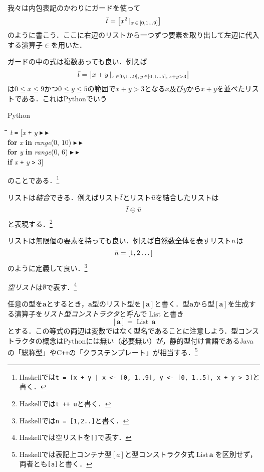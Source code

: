 \documentclass[twocolumn]{jsbook}
\newcommand{\cxx}{\textrm{C}\texttt{++}}
\newcommand{\keyword}[1]{{\emph{#1}}}
\newcommand{\code}[1]{\texttt{#1}}
\newenvironment{pythoncode}{\begin{itembox}[r]{Python}}{\end{itembox}}
\newenvironment{python}{\begin{tabbing}\hspace*{1em}\=\hspace*{1em}\=\hspace*{1em}\=\hspace*{1em}\=\kill}{\end{tabbing}}
\newcommand{\pthnId}[1]{\textit{#1}}
\newcommand{\pthnKeyword}[1]{\textbf{#1}}
\newcommand{\pthnOp}[1]{\texttt{#1}}
\newcommand{\pthnNextLine}{$\blacktriangleright\blacktriangleright$}
\newcommand{\hsklType}[1]{\textbf{#1}}
\newcommand{\hsklTypeConstructor}[1]{\mathop{\mathrm{#1}}}
\DeclareMathOperator{\hsklListConstructor}{\hsklTypeConstructor{List}}
\newcommand{\hsklAppend}{\oplus}
\newcommand{\hsklEmptyList}{\emptyset}
\newcommand{\hsklList}[1]{\Bar{#1}}
\newcommand{\hsklListType}[1]{[#1]}
\newcommand{\hsklTypeConstruct}[2]{#1\,#2}
\DeclareMathOperator{\mathFrom}{\in}
\newcommand{\mathGuard}[1]{\mathop{\mid_{#1}}}
\begin{document}
我々は内包表記のかわりにガードを使って$$\hsklList{t}=\left[x^2\mathGuard{x\mathFrom{[0,1\dots9]}}\right]$$のように書こう．ここに右辺のリストから一つずつ要素を取り出して左辺に代入する演算子$\mathFrom$を用いた．

ガードの中の式は複数あっても良い．例えば$$\hsklList{t}=\left[x+y\mathGuard{x\mathFrom[0,1\dots9],\,y\mathFrom[0,1\dots5],\,x+y>3}\right]$$は$0\le x\le9$かつ$0\le y\le5$の範囲で$x+y>3$となる$x$及び$y$から$x+y$を並べたリストである．これはPythonでいう
\begin{pythoncode}
\begin{python}
\pthnId{t} \pthnOp{=} [\pthnId{x} \pthnOp{+} \pthnId{y} \pthnNextLine\\
\>\pthnKeyword{for} \pthnId{x} \pthnKeyword{in} \pthnId{range}($0$, $10$) \pthnNextLine\\
\>\pthnKeyword{for} \pthnId{y} \pthnKeyword{in} \pthnId{range}($0$, $6$) \pthnNextLine\\
\>\pthnKeyword{if} \pthnId{x} \pthnOp{+} \pthnId{y} \pthnOp{>} $3$]
\end{python}
\end{pythoncode}
のことである．\footnote{Haskellでは\code{t = [x + y | x <- [0, 1..9], y <- [0, 1..5], x + y > 3]}と書く．}

リストは\keyword{結合}できる．例えばリスト$\hsklList{t}$とリスト$\hsklList{u}$を結合したリストは$$\hsklList{t}\hsklAppend\hsklList{u}$$と表現する．\footnote{Haskellでは\code{t ++ u}と書く．}

リストは無限個の要素を持っても良い．例えば自然数全体を表すリスト$\hsklList{n}$は$$\hsklList{n}=[1,2\dots]$$のように定義して良い．\footnote{Haskellでは\code{n = [1,2..]}と書く．}

\keyword{空リスト}は$\hsklEmptyList$で表す．\footnote{Haskellでは空リストを\code{[]}で表す．}

任意の型を$\hsklType{a}$とするとき，$\hsklType{a}$型のリスト型を$\hsklListType{\hsklType{a}}$と書く．型$\hsklType{a}$から型$\hsklListType{\hsklType{a}}$を生成する演算子を\keyword{リスト型コンストラクタ}と呼んで$\hsklListConstructor$と書き$$\hsklListType{\hsklType{a}}=\hsklTypeConstruct{\hsklListConstructor}{\hsklType{a}}$$とする．この等式の両辺は変数ではなく型名であることに注意しよう．型コンストラクタの概念はPythonには無い（必要無い）が，静的型付け言語であるJavaの「総称型」や\cxx の「クラステンプレート」が相当する．\footnote{Haskellでは表記上コンテナ型$\hsklListType{a}$と型コンストラクタ式$\hsklTypeConstruct{\hsklListConstructor}{\hsklType{a}}$を区別せず，両者とも\code{[a]}と書く．}
\end{document}
